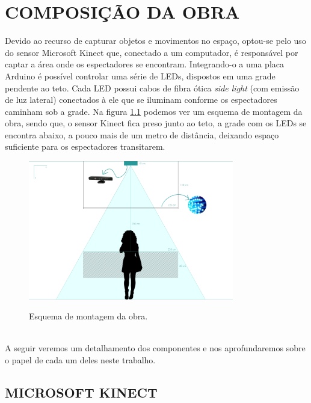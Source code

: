 \chapter{COMPOSIÇÃO DA OBRA}

Devido ao recurso de capturar objetos e movimentos no espaço, optou-se pelo uso do sensor Microsoft Kinect que, conectado a um computador, é responsável por captar a área onde os espectadores se encontram. Integrando-o a uma placa Arduino é possível controlar uma série de LEDs, dispostos em uma grade pendente ao teto. Cada LED possui cabos de fibra ótica \textit{side light} (com emissão de luz lateral) conectados à ele que se iluminam conforme os espectadores caminham sob a grade. Na figura \ref{fig:esquema} podemos ver um esquema de montagem da obra, sendo que, o sensor Kinect fica preso junto ao teto, a grade com os LEDs se encontra abaixo, a pouco mais de um metro de distância, deixando espaço suficiente para os espectadores transitarem.

\begin{figure}[H]
    \centering
    \caption{Esquema de montagem da obra.}
	\vspace*{0,2cm}
    \includegraphics[width=0.8\textwidth]{./04-figuras/esquema}
    \label{fig:esquema}
\end{figure}
\vspace*{-0,9cm}
{\raggedright {}}\\

A seguir veremos um detalhamento dos componentes e nos aprofundaremos sobre o papel de cada um deles neste trabalho. 

\section{MICROSOFT KINECT}

